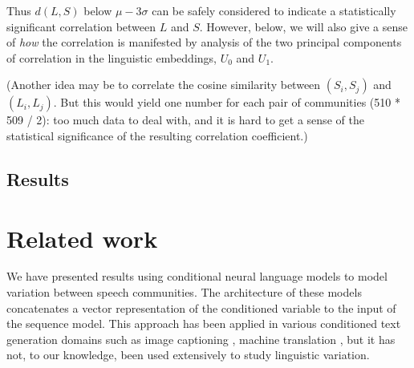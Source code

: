 \documentclass[11pt]{article}
\begin{document}
Thus \(d(L,S)\) below \(μ-3σ\) can be safely considered to indicate a
statistically significant correlation between \(L\) and
\(S\). However, below, we will also give a sense of \emph{how} the
correlation is manifested by analysis of the two principal components
of correlation in the linguistic embeddings, \(U_0\) and \(U_1\).


(Another idea may be to correlate the cosine similarity between
\((S_i,S_j)\) and \((L_i,L_j)\). But this would yield one number for
each pair of communities (510 * 509 / 2): too much data to deal with,
and it is hard to get a sense of the statistical significance of the
resulting correlation coefficient.)




\subsection{Results}







\section{Related work}

We have presented results using conditional neural language models
to model variation between speech communities.
The architecture of these models concatenates a vector representation
of the conditioned variable to the input of the sequence model.
This approach has been applied in various conditioned text generation domains such as 
image captioning \citep{Vinyals2015}, machine translation \citep{Kalchbrenner2013},
but it has not, to our knowledge, been used extensively to study linguistic variation.
\end{document}

